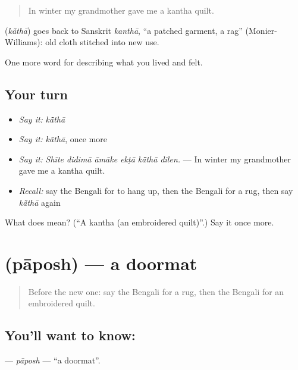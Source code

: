 \begin{quote}
In winter my grandmother gave me a kantha quilt.
\end{quote}

\begin{cousinweb}
\textbf{} (\emph{kā̃thā}) goes back to Sanskrit \emph{kanthā}, \textquotedblleft{}a patched garment, a rag\textquotedblright{} (Monier-Williams): old cloth stitched into new use.
\end{cousinweb}

\begin{grammarlens}[title={What you've built}]
One more word for describing what you lived and felt.
\end{grammarlens}

\subsection*{Your turn}
\begin{itemize}
\raggedright
  \item \emph{Say it:} \emph{kā̃thā}
  \item \emph{Say it:} \emph{kā̃thā}, once more
  \item \emph{Say it:} \emph{Shīte didimā āmāke ekṭā kā̃thā dilen.} — In winter my grandmother gave me a kantha quilt.
  \item \emph{Recall:} say the Bengali for to hang up, then the Bengali for a rug, then say \emph{kā̃thā} again
\end{itemize}

\begin{tcolorbox}[breakable,colback=teal!4,colframe=teal!35!black,title={Before you move on}]
What does  mean? (\textquotedblleft{}A kantha (an embroidered quilt)\textquotedblright{}.) Say it once more.
\end{tcolorbox}
\section[\texorpdfstring{\bn{পাপোশ} (pāposh)}{পাপোশ (pāposh)}]{ (pāposh) — a doormat}

\label{lesson:BN-C509-paposh}



\begin{quote}
Before the new one: say the Bengali for a rug, then the Bengali for an embroidered quilt.
\end{quote}

\subsection*{You'll want to know: }
\textbf{} — \emph{pāposh} — \textquotedblleft{}a doormat\textquotedblright{}.

